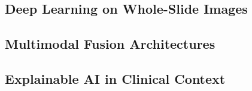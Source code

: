 \documentclass[11pt,a4paper]{article}
\begin{document}
\subsection{Deep Learning on Whole-Slide Images}

\subsection{Multimodal Fusion Architectures}

\subsection{Explainable AI in Clinical Context}
\end{document}
